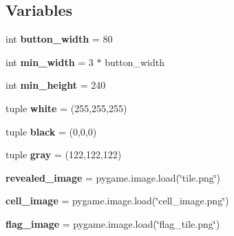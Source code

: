 \subsection*{Variables}
\begin{DoxyCompactItemize}
\item 
\mbox{\label{namespacesweeper___u_i_ac2685bc015f77c62e660b989c2625e2d}} 
int {\bfseries button\+\_\+width} = 80
\item 
\mbox{\label{namespacesweeper___u_i_a10803f7f3f641ad4d8cfbd88fc64af2f}} 
int {\bfseries min\+\_\+width} = 3 $\ast$ button\+\_\+width
\item 
\mbox{\label{namespacesweeper___u_i_a1f3bcddbea407f212391e874256a6c61}} 
int {\bfseries min\+\_\+height} = 240
\item 
\mbox{\label{namespacesweeper___u_i_a2ae5ba1ea6d8eefbe0e4af11ee6b17eb}} 
tuple {\bfseries white} = (255,255,255)
\item 
\mbox{\label{namespacesweeper___u_i_aef4353ac12e94cb4073e1d59bd205901}} 
tuple {\bfseries black} = (0,0,0)
\item 
\mbox{\label{namespacesweeper___u_i_a540da8f8a58ac7664a031ef2fbf9aa50}} 
tuple {\bfseries gray} = (122,122,122)
\item 
\mbox{\label{namespacesweeper___u_i_a4d92156c6646b42c221da4391e6bac42}} 
{\bfseries revealed\+\_\+image} = pygame.\+image.\+load(\char`\"{}tile.\+png\char`\"{})
\item 
\mbox{\label{namespacesweeper___u_i_abe49380b28b05717984f98245ef82b38}} 
{\bfseries cell\+\_\+image} = pygame.\+image.\+load(\char`\"{}cell\+\_\+image.\+png\char`\"{})
\item 
\mbox{\label{namespacesweeper___u_i_acacaf18f9f4ac7e1d2c92f337ca528ba}} 
{\bfseries flag\+\_\+image} = pygame.\+image.\+load(\char`\"{}flag\+\_\+tile.\+png\char`\"{})
\item 
\mbox{\label{namespacesweeper___u_i_a2933482fc7dcd3706b03c71a2bb92a13}} 

\end{DoxyCompactItemize}
